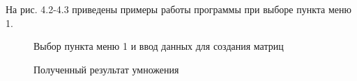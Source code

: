 \documentclass[12pt]{report}
\begin{document}
На рис. 4.2-4.3 приведены примеры работы программы при выборе пункта меню 1.

\begin{figure}[h]
	\caption{Выбор пункта меню 1 и ввод данных для создания матриц}
	\label{figure:image}
\end{figure}

\begin{figure}[h]
	\caption{Полученный результат умножения}
	\label{figure:image}
\end{figure}
\end{document}
